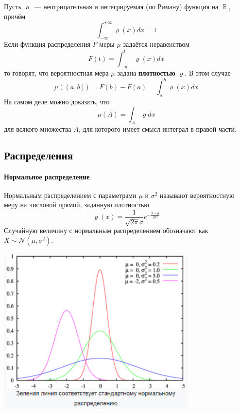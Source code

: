 \documentclass[12pt]{article}
\DeclareMathOperator{\RR}{\mathbb{R}}
\begin{document}
    Пусть $\varrho$~--- неотрицательная и интегрируемая (по Риману) функция на $\RR$, причём
    \begin{equation*}
        \int_{-\infty}^{+\infty} \varrho(x) dx = 1
    \end{equation*}
    Если функция распределения $F$ меры $\mu$ задаётся неравенством
    \begin{equation*}
        F(t) = \int_{-\infty}^{t} \varrho(x) dx
    \end{equation*}
    то говорят, что вероятностная мера $\mu$ задана \textbf{плотностью} $\varrho$. В этом случае
    \begin{equation*}
        \mu(\left(a, b\right]) = F(b) - F(a) = \int_{a}^{b} \varrho(x)dx
    \end{equation*}
    На самом деле можно доказать, что
    \begin{equation*}
        \mu(A) = \int_A \varrho dx
    \end{equation*}
    для всякого множества $A$, для которого имеет смысл интеграл в правой части.

    \subsection{Распределения}
    \paragraph{Нормальное распределение}
    Нормальным распределением с параметрами $\mu$ и $\sigma^2$ называют вероятностную меру на числовой прямой, заданную плотностью
    \begin{equation*}
        \varrho(x) = \frac{1}{\sqrt{2\pi}\sigma} e^{-\frac{x - \mu}{2 \sigma^2}}
    \end{equation*}
    Случайную величину с нормальным распределением обозначают как $X \sim \mathcal{N}(\mu, \sigma^2)$.
    \begin{center}
        \includegraphics[width=10cm]{normal.png}
    \end{center}
\end{document}
